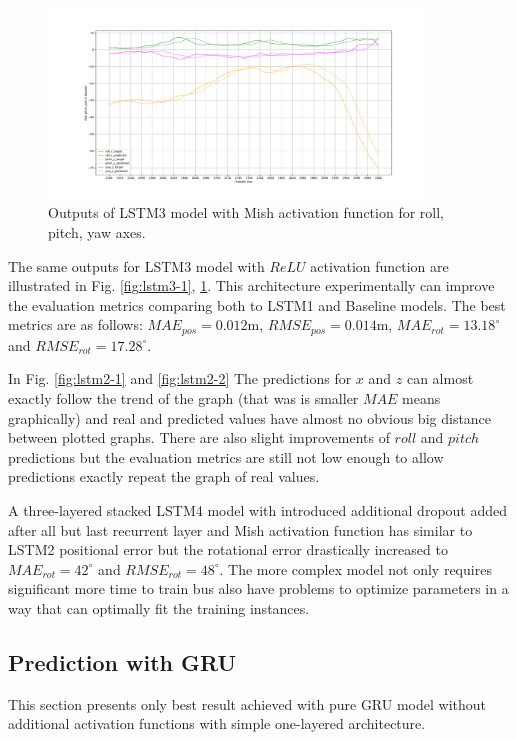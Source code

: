\begin{figure}[b!]
	\begin{center}
		\includegraphics[width=0.9\textwidth, keepaspectratio]{gfx/lstm3_mish-roll_pitch_yaw.pdf}
		\caption{\label{fig:lstm3-2} Outputs of LSTM3 model with Mish activation function for roll, pitch, yaw axes.}
	\end{center}
\end{figure}

The same outputs for LSTM3 model with $ReLU$ activation function are illustrated in Fig. \ref{fig:lstm3-1}, \ref{fig:lstm3-2}. This architecture experimentally can improve the evaluation metrics comparing both to LSTM1 and Baseline models. The best metrics are as follows:  $MAE_{pos} = 0.012$m, $RMSE_{pos} = 0.014$m, $MAE_{rot} = 13.18^{\circ}$ and $RMSE_{rot}  =17.28^{\circ}$.

In Fig. \ref{fig:lstm2-1} and \ref{fig:lstm2-2}  The predictions for $x$ and $z$ can almost exactly follow the trend of the graph (that was is smaller $MAE$ means graphically) and real and predicted values have almost no obvious big distance between plotted graphs. There are also slight improvements of $roll$ and $pitch$ predictions but the evaluation metrics are still not low enough to allow predictions exactly repeat the graph of real values. 

A three-layered stacked LSTM4 model with introduced additional dropout added after all but last recurrent layer and Mish activation function has similar to LSTM2 positional error but the rotational error drastically increased to $MAE_{rot} = 42^{\circ}$ and $RMSE_{rot}  =48^{\circ}$. The more complex model not only requires significant more time to train bus also have problems to optimize parameters in a way that can optimally fit the training instances. 

\subsection{Prediction with GRU}
\label{sec:eval:experiments:gru}
This section presents only best result achieved with pure GRU model without additional activation functions with simple one-layered architecture. 

